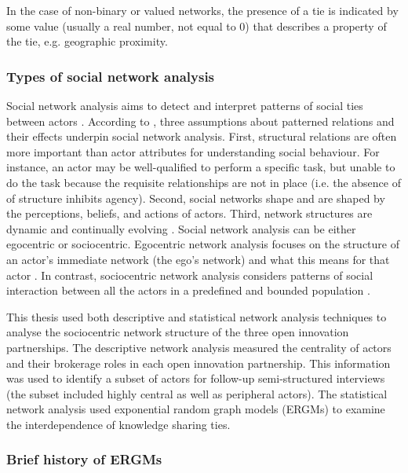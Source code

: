 In the case of non-binary or valued networks, the presence of a tie is indicated by some value (usually a real number, not equal to 0) that describes a property of the tie, e.g. geographic proximity.

\subsubsection{Types of social network analysis}

Social network analysis aims to detect and interpret patterns of social ties between actors \citep{de2011exploratory}. According to \citet{knoke2008social}, three assumptions about patterned relations and their effects underpin social network analysis. First, structural relations are often more important than actor attributes for understanding social behaviour. For instance, an actor may be well-qualified to perform a specific task, but unable to do the task because the requisite relationships are not in place (i.e. the absence of of structure inhibits agency). Second, social networks shape and are shaped by the perceptions, beliefs, and actions of actors. Third, network structures are dynamic and continually evolving \citep{knoke2008social}. Social network analysis can be either egocentric or sociocentric. Egocentric network analysis focuses on the structure of an actor's immediate network (the ego's network) and what this means for that actor \citep{chung2005exploring}. In contrast, sociocentric network analysis considers patterns of social interaction between all the actors in a predefined and bounded population \citep{provan2007interorganizational}. \medskip

This thesis used both descriptive and statistical network analysis techniques to analyse the sociocentric network structure of the three open innovation partnerships. The descriptive network analysis measured the centrality of actors and their brokerage roles in each open innovation partnership. This information was used to identify a subset of actors for follow-up semi-structured interviews (the subset included highly central as well as peripheral actors). The statistical network analysis used exponential random graph models (ERGMs) to examine the interdependence of knowledge sharing ties.

\subsubsection{Brief history of ERGMs}


